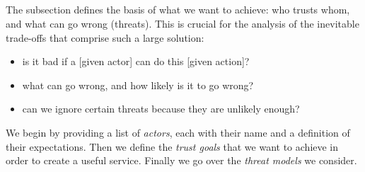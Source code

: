 \subsection{\rot}

The \rot subsection defines the basis of what we want to achieve: who trusts whom, and what can go wrong (threats).
This is crucial for the analysis of the inevitable trade-offs that comprise such a large solution:

\begin{itemize}
    \item is it bad if a [given actor] can do this [given action]?
    \item what can go wrong, and how likely is it to go wrong?
    \item can we ignore certain threats because they are unlikely enough?
\end{itemize}

We begin by providing a list of \emph{actors}, each with their name and a definition of their expectations.
Then we define the \emph{trust goals} that we want to achieve in order to create a useful service.
Finally we go over the \emph{threat models} we consider.




